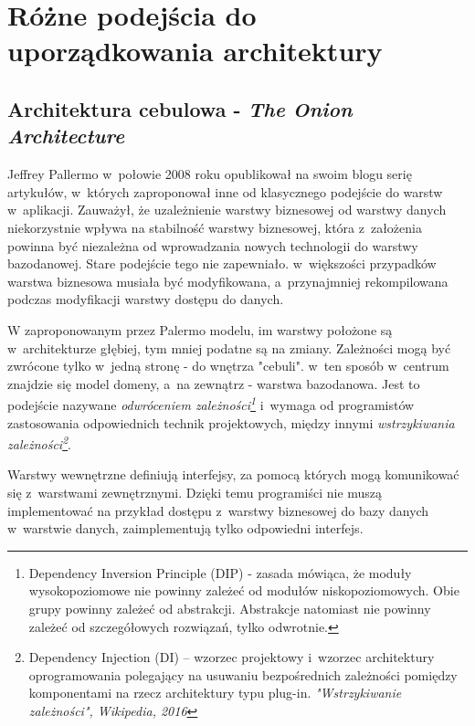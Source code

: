 \section{Różne podejścia do uporządkowania architektury}
\subsection{Architektura cebulowa - \textit{The Onion Architecture}}
Jeffrey Pallermo w~połowie 2008 roku opublikował na swoim blogu serię artykułów\cite{website:architect:onion}, w~których zaproponował inne od klasycznego podejście do warstw w~aplikacji. Zauważył, że uzależnienie warstwy biznesowej od warstwy danych niekorzystnie wpływa na stabilność warstwy biznesowej, która z~założenia powinna być niezależna od wprowadzania nowych technologii do warstwy bazodanowej. Stare podejście tego nie zapewniało. w~większości przypadków warstwa biznesowa musiała być modyfikowana, a~przynajmniej rekompilowana podczas modyfikacji warstwy dostępu do danych.

W zaproponowanym przez Palermo modelu, im warstwy położone są w~architekturze głębiej, tym mniej podatne są na zmiany. Zależności mogą być zwrócone tylko w~jedną stronę - do wnętrza "cebuli". w~ten sposób w~centrum znajdzie się model domeny, a~na zewnątrz - warstwa bazodanowa. Jest to podejście nazywane \textit{odwróceniem zależności\footnote{Dependency Inversion Principle (DIP) - zasada mówiąca, że moduły wysokopoziomowe nie powinny zależeć od modułów niskopoziomowych. Obie grupy powinny zależeć od abstrakcji. Abstrakcje natomiast nie powinny zależeć od szczegółowych rozwiązań, tylko odwrotnie.}} i~wymaga od programistów zastosowania odpowiednich technik projektowych, między innymi \textit{wstrzykiwania zależności\footnote{Dependency Injection (DI) – wzorzec projektowy i~wzorzec architektury oprogramowania polegający na usuwaniu bezpośrednich zależności pomiędzy komponentami na rzecz architektury typu plug-in. \textit{"Wstrzykiwanie zależności", Wikipedia, 2016}}}.

Warstwy wewnętrzne definiują interfejsy, za pomocą których mogą komunikować się z~warstwami zewnętrznymi. Dzięki temu programiści nie muszą implementować na przykład dostępu z~warstwy biznesowej do bazy danych w~warstwie danych, zaimplementują tylko odpowiedni interfejs.

